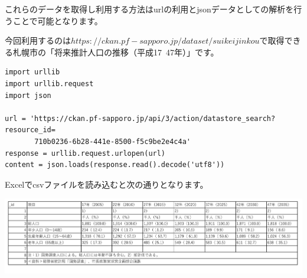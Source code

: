 これらのデータを取得し利用する方法はurlの利用とjsonデータとしての解析を行うことで可能となります。

今回利用するのは$https://ckan.pf-sapporo.jp/dataset/suikeijinkou$で取得できる札幌市の「将来推計人口の推移（平成17~47年）」です。


\begin{verbatim}
import urllib
import urllib.request
import json

url = 'https://ckan.pf-sapporo.jp/api/3/action/datastore_search?resource_id=
       710b0236-6b28-441e-8500-f5c9be2e4c4a'
response = urllib.request.urlopen(url)
content = json.loads(response.read().decode('utf8'))

\end{verbatim}

Excelでcsvファイルを読み込むと次の通りとなります。

\includegraphics[width=14cm]{images/webapi1.png}
